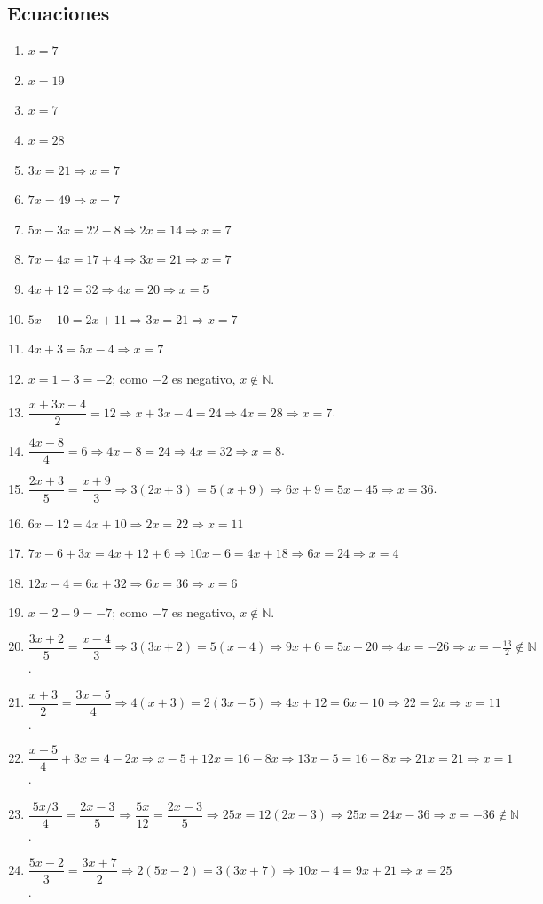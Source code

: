 \documentclass[12pt, letterpaper]{article}
\newcommand{\N}{\mathbb{N}}
\begin{document}
  \subsection*{Ecuaciones}
  \begin{enumerate}[leftmargin=*, label=\textbf{\arabic*.}]
    \item $x = 7$
    \item $x = 19$
    \item $x = 7$
    \item $x = 28$
    \item $3x = 21 \Rightarrow x = 7$
    \item $7x = 49 \Rightarrow x = 7$
    \item $5x - 3x = 22 - 8 \Rightarrow 2x = 14 \Rightarrow x = 7$
    \item $7x - 4x = 17 + 4 \Rightarrow 3x = 21 \Rightarrow x = 7$
    \item $4x + 12 = 32 \Rightarrow 4x = 20 \Rightarrow x = 5$
    \item $5x - 10 = 2x + 11 \Rightarrow 3x = 21 \Rightarrow x = 7$
    \item $4x + 3 = 5x - 4 \Rightarrow x = 7$
    \item $x = 1 - 3 = -2$; como $-2$ es negativo, $x \notin \N$.
    \item $\dfrac{x + 3x - 4}{2} = 12 \Rightarrow x + 3x - 4 = 24 \Rightarrow 4x = 28 \Rightarrow x = 7$.
    \item $\dfrac{4x - 8}{4} = 6 \Rightarrow 4x - 8 = 24 \Rightarrow 4x = 32 \Rightarrow x = 8$.
    \item $\dfrac{2x + 3}{5} = \dfrac{x + 9}{3} \Rightarrow 3(2x + 3) = 5(x + 9) \Rightarrow 6x + 9 = 5x + 45 \Rightarrow x = 36$.
    \item $6x - 12 = 4x + 10 \Rightarrow 2x = 22 \Rightarrow x = 11$
    \item $7x - 6 + 3x = 4x + 12 + 6 \Rightarrow 10x - 6 = 4x + 18 \Rightarrow 6x = 24 \Rightarrow x = 4$
    \item $12x - 4 = 6x + 32 \Rightarrow 6x = 36 \Rightarrow x = 6$
    \item $x = 2 - 9 = -7$; como $-7$ es negativo, $x \notin \N$.
    \item $\dfrac{3x + 2}{5} = \dfrac{x - 4}{3} \Rightarrow 3(3x + 2) = 5(x - 4) \Rightarrow 9x + 6 = 5x - 20 \Rightarrow 4x = -26 \Rightarrow x = -\tfrac{13}{2} \notin \N$.
    \item $\dfrac{x + 3}{2} = \dfrac{3x - 5}{4} \Rightarrow 4(x + 3) = 2(3x - 5) \Rightarrow 4x + 12 = 6x - 10 \Rightarrow 22 = 2x \Rightarrow x = 11$.
    \item $\dfrac{x - 5}{4} + 3x = 4 - 2x \Rightarrow x - 5 + 12x = 16 - 8x \Rightarrow 13x - 5 = 16 - 8x \Rightarrow 21x = 21 \Rightarrow x = 1$.
    \item $\dfrac{\;5x/3\;}{4} = \dfrac{2x - 3}{5} \Rightarrow \dfrac{5x}{12} = \dfrac{2x - 3}{5} \Rightarrow 25x = 12(2x - 3) \Rightarrow 25x = 24x - 36 \Rightarrow x = -36 \notin \N$.
    \item $\dfrac{5x - 2}{3} = \dfrac{3x + 7}{2} \Rightarrow 2(5x - 2) = 3(3x + 7) \Rightarrow 10x - 4 = 9x + 21 \Rightarrow x = 25$.
  \end{enumerate}
\end{document}
